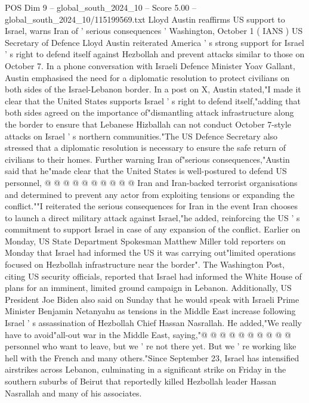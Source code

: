 \begin{textsample}{POS Dim 9 – global\_south\_2024\_10 – Score 5.00 – global\_south\_2024\_10/115199569.txt}  \label{ex:f9_pos_090}
Lloyd Austin reaffirms US support to Israel, warns Iran of ' serious consequences ' Washington, October 1 ( IANS ) US Secretary of Defence Lloyd Austin reiterated America ' s strong support for Israel ' s right to defend itself against Hezbollah and prevent attacks similar to those on October 7.
In a phone conversation with Israeli Defence Minister Yoav Gallant, Austin emphasised the need for a diplomatic resolution to protect civilians on both sides of the Israel-Lebanon border.
In a post on X, Austin stated,"I made it clear that the United States supports Israel ' s right to defend itself,"adding that both sides agreed on the importance of"dismantling attack infrastructure along the border to ensure that Lebanese Hizballah can not conduct October 7-style attacks on Israel ' s northern communities."The US Defence Secretary also stressed that a diplomatic resolution is necessary to ensure the safe return of civilians to their homes.
Further warning Iran of"serious consequences,"Austin said that he"made clear that the United States is well-postured to defend US personnel, @ @ @ @ @ @ @ @ @ @ Iran and Iran-backed terrorist organisations and determined to prevent any actor from exploiting tensions or expanding the conflict.""I reiterated the serious consequences for Iran in the event Iran chooses to launch a direct military attack against Israel,"he added, reinforcing the US ' s commitment to support Israel in case of any expansion of the conflict.
Earlier on Monday, US State Department Spokesman Matthew Miller told reporters on Monday that Israel had informed the US it was carrying out"limited operations focused on Hezbollah infrastructure near the border".
The Washington Post, citing US security officials, reported that Israel had informed the White House of plans for an imminent, limited ground campaign in Lebanon.
Additionally, US President Joe Biden also said on Sunday that he would speak with Israeli Prime Minister Benjamin Netanyahu as tensions in the Middle East increase following Israel ' s assassination of Hezbollah Chief Hassan Nasrallah.
He added,"We really have to avoid"all-out war in the Middle East, saying,"@ @ @ @ @ @ @ @ @ @ personnel who want to leave, but we ' re not there yet.
But we ' re working like hell with the French and many others."Since September 23, Israel has intensified airstrikes across Lebanon, culminating in a significant strike on Friday in the southern suburbs of Beirut that reportedly killed Hezbollah leader Hassan Nasrallah and many of his associates.

\end{textsample}
